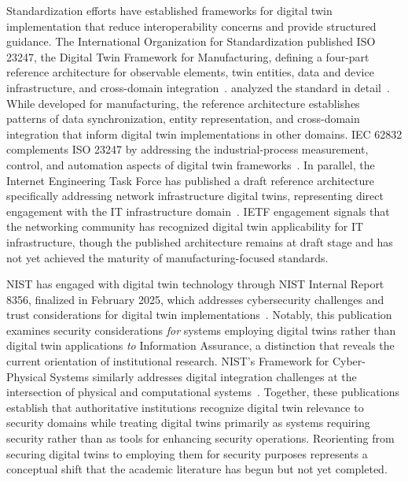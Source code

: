 Standardization efforts have established frameworks for digital twin implementation that reduce interoperability concerns and provide structured guidance. The International Organization for Standardization published ISO 23247, the Digital Twin Framework for Manufacturing, defining a four-part reference architecture for observable elements, twin entities, data and device infrastructure, and cross-domain integration~\parencite{ISO_23247_2021}. \citeauthor{Shao_ISO_23247_2023} analyzed the standard in detail~\parencite{Shao_ISO_23247_2023}. While developed for manufacturing, the reference architecture establishes patterns of data synchronization, entity representation, and cross-domain integration that inform digital twin implementations in other domains. IEC 62832 complements ISO 23247 by addressing the industrial-process measurement, control, and automation aspects of digital twin frameworks~\parencite{Shao_2021}. In parallel, the Internet Engineering Task Force has published a draft reference architecture specifically addressing network infrastructure digital twins, representing direct engagement with the IT infrastructure domain~\parencite{IETF_NDT_2024}. IETF engagement signals that the networking community has recognized digital twin applicability for IT infrastructure, though the published architecture remains at draft stage and has not yet achieved the maturity of manufacturing-focused standards.

NIST has engaged with digital twin technology through NIST Internal Report 8356, finalized in February 2025, which addresses cybersecurity challenges and trust considerations for digital twin implementations~\parencite{NIST_IR_8356_2025}.
Notably, this publication examines security considerations \textit{for} systems employing digital twins rather than digital twin applications \textit{to} Information Assurance, a distinction that reveals the current orientation of institutional research. NIST's Framework for Cyber-Physical Systems similarly addresses digital integration challenges at the intersection of physical and computational systems~\parencite{NIST_CPS_Framework_2017}. Together, these publications establish that authoritative institutions recognize digital twin relevance to security domains while treating digital twins primarily as systems requiring security rather than as tools for enhancing security operations. Reorienting from securing digital twins to employing them for security purposes represents a conceptual shift that the academic literature has begun but not yet completed.


